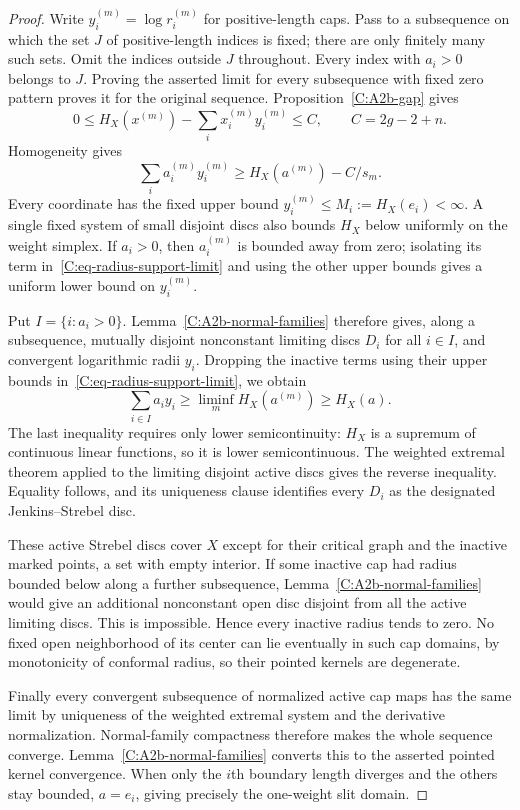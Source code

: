 \begin{proof}
Write $y_i^{(m)}=\log r_i^{(m)}$ for positive-length caps. Pass to a subsequence on which the set $J$ of positive-length indices is fixed; there are only finitely many such sets. Omit the indices outside $J$ throughout. Every index with $a_i>0$ belongs to $J$. Proving the asserted limit for every subsequence with fixed zero pattern proves it for the original sequence. Proposition~\ref{C:A2b-gap} gives
\[
 0\leq H_X(x^{(m)})-\sum_i x_i^{(m)}y_i^{(m)}\leq C,
 \qquad C=2g-2+n.
\]
Homogeneity gives
\begin{equation}
 \sum_i a_i^{(m)}y_i^{(m)}\geq H_X(a^{(m)})-C/s_m.
 \label{C:eq-radius-support-limit}
\end{equation}
Every coordinate has the fixed upper bound
$y_i^{(m)}\leq M_i:=H_X(e_i)<\infty$. A single fixed system of small disjoint discs also bounds $H_X$ below uniformly on the weight simplex. If $a_i>0$, then $a_i^{(m)}$ is bounded away from zero; isolating its term in~\eqref{C:eq-radius-support-limit} and using the other upper bounds gives a uniform lower bound on $y_i^{(m)}$.

Put $I=\{i:a_i>0\}$. Lemma~\ref{C:A2b-normal-families} therefore gives, along a subsequence, mutually disjoint nonconstant limiting discs $D_i$ for all $i\in I$, and convergent logarithmic radii $y_i$. Dropping the inactive terms using their upper bounds in~\eqref{C:eq-radius-support-limit}, we obtain
\[
 \sum_{i\in I}a_i y_i
 \geq\liminf_m H_X(a^{(m)})\geq H_X(a).
\]
The last inequality requires only lower semicontinuity: $H_X$ is a supremum of continuous linear functions, so it is lower semicontinuous. The weighted extremal theorem applied to the limiting disjoint active discs gives the reverse inequality. Equality follows, and its uniqueness clause identifies every $D_i$ as the designated Jenkins--Strebel disc.

These active Strebel discs cover $X$ except for their critical graph and the inactive marked points, a set with empty interior. If some inactive cap had radius bounded below along a further subsequence, Lemma~\ref{C:A2b-normal-families} would give an additional nonconstant open disc disjoint from all the active limiting discs. This is impossible. Hence every inactive radius tends to zero. No fixed open neighborhood of its center can lie eventually in such cap domains, by monotonicity of conformal radius, so their pointed kernels are degenerate.

Finally every convergent subsequence of normalized active cap maps has the same limit by uniqueness of the weighted extremal system and the derivative normalization. Normal-family compactness therefore makes the whole sequence converge. Lemma~\ref{C:A2b-normal-families} converts this to the asserted pointed kernel convergence. When only the $i$th boundary length diverges and the others stay bounded, $a=e_i$, giving precisely the one-weight slit domain.
\end{proof}

